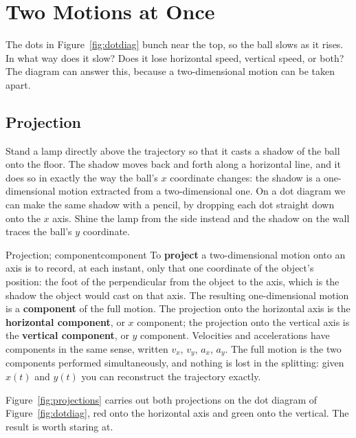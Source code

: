 \documentclass[11pt,twoside,openany]{book}
\begin{document}
\section{Two Motions at Once}
\label{sec:twomotions}

The dots in Figure~\ref{fig:dotdiag} bunch near the top, so the ball slows as it rises. In what way does it slow? Does it lose horizontal speed, vertical speed, or both? The diagram can answer this, because a two-dimensional motion can be taken apart.

\subsection{Projection}

Stand a lamp directly above the trajectory so that it casts a shadow of the ball onto the floor. The shadow moves back and forth along a horizontal line, and it does so in exactly the way the ball's $x$ coordinate changes: the shadow is a one-dimensional motion extracted from a two-dimensional one. On a dot diagram we can make the same shadow with a pencil, by dropping each dot straight down onto the $x$ axis. Shine the lamp from the side instead and the shadow on the wall traces the ball's $y$ coordinate.

\begin{definition}{Projection; component}{component}
To \textbf{project} a two-dimensional motion onto an axis is to record, at each instant, only that one coordinate of the object's position: the foot of the perpendicular from the object to the axis, which is the shadow the object would cast on that axis. The resulting one-dimensional motion is a \textbf{component} of the full motion. The projection onto the horizontal axis is the \textbf{horizontal component}, or $x$ component; the projection onto the vertical axis is the \textbf{vertical component}, or $y$ component. Velocities and accelerations have components in the same sense, written $v_x$, $v_y$, $a_x$, $a_y$. The full motion is the two components performed simultaneously, and nothing is lost in the splitting: given $x(t)$ and $y(t)$ you can reconstruct the trajectory exactly.
\end{definition}

Figure~\ref{fig:projections} carries out both projections on the dot diagram of Figure~\ref{fig:dotdiag}, red onto the horizontal axis and green onto the vertical. The result is worth staring at.
\end{document}
